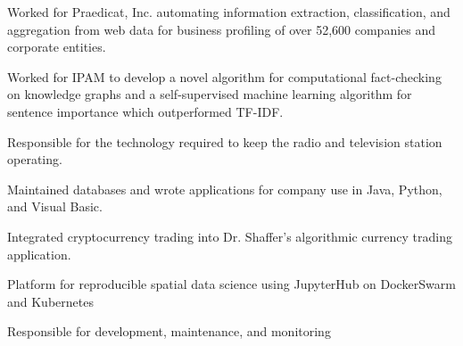 \documentclass{acmresume}
\begin{document}
        \begin{titemize}
            \item{Worked for Praedicat, Inc. automating information extraction, classification, and aggregation from web data for business profiling of over 52,600 companies and corporate entities.}
            \item{Worked for IPAM to develop a novel algorithm for computational fact-checking on knowledge graphs and a self-supervised machine learning algorithm for sentence importance which outperformed TF-IDF.}
        \end{titemize}

        \begin{titemize}
            \item{Responsible for the technology required to keep the radio and television station operating.}
        \end{titemize}
		
        \begin{titemize}
            \item{Maintained databases and wrote applications for company use in Java, Python, and Visual Basic.}
        \end{titemize}

        \begin{titemize}
            \item Integrated cryptocurrency trading into Dr. Shaffer's algorithmic currency trading application.
        \end{titemize}
		
	
        
        \begin{titemize}
            \item Platform for reproducible spatial data science using JupyterHub on DockerSwarm and Kubernetes
            \item Responsible for development, maintenance, and monitoring
        \end{titemize}
		
\end{document}
